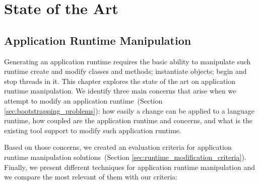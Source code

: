 
\part{State of the Art}



\chapter{Application Runtime Manipulation}
\minitoc

Generating an application runtime requires the basic ability to manipulate such runtime \eg create and modify classes and methods; instantiate objects; begin and stop threads in it. This chapter explores the state of the art on application runtime manipulation. We identify three main concerns that arise when we attempt to modify an application runtime~(Section \ref{sec:bootstrapping_problems}): how easily a change can be applied to a language runtime, how coupled are the application runtime and \VM concerns, and what is the existing tool support to modify such application runtime.

Based on those concerns, we created an evaluation criteria for application runtime manipulation solutions~(Section \ref{sec:runtime_modification_criteria}). Finally, we present different techniques for application runtime manipulation and we compare the most relevant of them with our criteria:

